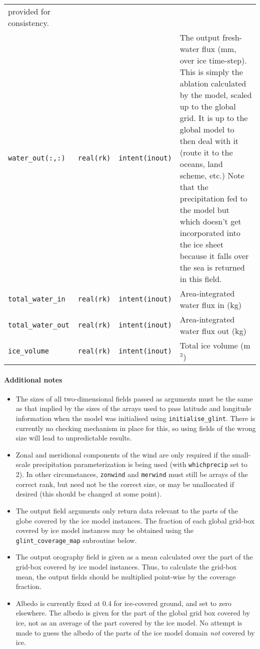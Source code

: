 \begin{center}
\begin{supertabular}{lllp{5.5cm}}
    provided for consistency.\\
    \texttt{water\_out(:,:)} & \texttt{real(rk)} & \texttt{intent(inout)} & The
    output fresh-water flux (mm, over ice time-step). This is simply the ablation calculated by
    the model, scaled up to the global grid. It is up to the global model to
    then  deal with it (route it to the oceans, land scheme, etc.) Note that
    the precipitation fed to the model but which doesn't get incorporated into
    the ice sheet because it falls over the sea is returned in this field. \\ 
    \texttt{total\_water\_in} & \texttt{real(rk)} & \texttt{intent(inout)} &
    Area-integrated water flux in (kg)\\ 
    \texttt{total\_water\_out} & \texttt{real(rk)} & \texttt{intent(inout)} &
    Area-integrated water flux out (kg)\\
    \texttt{ice\_volume} & \texttt{real(rk)} & \texttt{intent(inout)} & Total ice volume (m$^3$)\\
  \end{supertabular}
\end{center}
\paragraph{Additional notes}
%
\begin{itemize}
\item The sizes of all two-dimensional fields passed as arguments must be the
  same as that implied by the sizes of the arrays used to pass latitude and
  longitude information when the model was initialised using
  \texttt{initialise\_glint}. There is
  currently no checking mechanism in place for this, so using fields of the wrong size
  will lead to unpredictable results.
\item Zonal and meridional components of the wind are only required if the
  small-scale precipitation parameterization is being used (with
  \texttt{whichprecip} set to 2). In other circumstances, \texttt{zonwind} and
  \texttt{merwind} must still be arrays of the correct rank, but need not be
  the correct size, or may be unallocated if desired (this should be changed
  at some point).
\item The output field arguments only return data relevant to the parts of the globe
  covered by the ice model instances. The fraction of each global
  grid-box covered by ice model instances may be obtained using the
  \texttt{glint\_coverage\_map} subroutine below. 
\item The output orography field is given as a mean calculated over the part
  of the grid-box covered by ice  model instances. Thus, to calculate the
  grid-box mean, the output fields should be multiplied point-wise by the
  coverage fraction. 
\item Albedo is currently fixed at 0.4 for ice-covered ground, and set to zero
  elsewhere. The albedo is given for the part of the global grid box covered
  by ice, not as an average of the part covered by the ice model. No attempt
  is made to guess the albedo of the parts of the ice model domain \emph{not}
  covered by ice.
\end{itemize}
%
